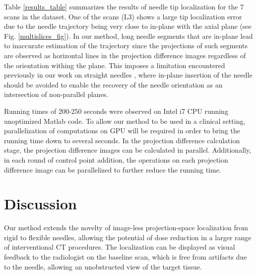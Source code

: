\documentclass[letterpaper, 11 pt, conference]{ieeeconf} %
\begin{document}
Table \ref{results_table} summarizes the results of needle tip localization for the 7 scans in the dataset. One of the scans (L3) shows a large tip localization error due to the needle trajectory being very close to in-plane with the axial plane (see Fig. \ref{multislices_fig}). In our method, long needle segments that are in-plane lead to inaccurate estimation of the trajectory since the projections of such segments are observed as horizontal lines in the projection difference images regardless of the orientation withing the plane. This imposes a limitation encountered previously in our work on straight needles \cite{medan2017reduced}, where in-plane insertion of the needle should be avoided to enable the recovery of the needle orientation as an intersection of non-parallel planes.

Running times of 200-250 seconds were observed on Intel i7 CPU running unoptimized Matlab code. To allow our method to be used in a clinical setting, parallelization of computations on GPU will be required in order to bring the running time down to several seconds. In the projection difference calculation stage, the projection difference images can be calculated in parallel. Additionally, in each round of control point addition, the operations on each projection difference image can be parallelized to further reduce the running time.

\section{Discussion}
Our method extends the novelty of image-less projection-space localization from rigid to flexible needles, allowing the potential of dose reduction in a larger range of interventional CT procedures. The localization can be displayed as visual feedback to the radiologist on the baseline scan, which is free from artifacts due to the needle, allowing an unobstructed view of the target tissue.
\end{document}
